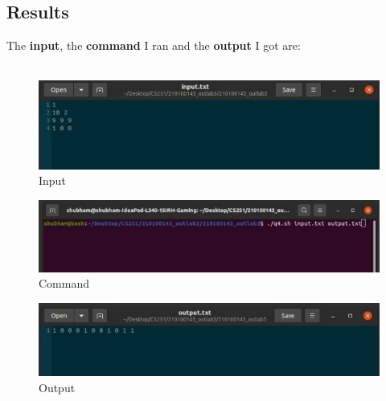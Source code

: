 \documentclass[12pt]{article}
\begin{document}
\subsection{Results}
\vspace*{1em}
The \textbf{input}, the \textbf{command} I ran and the \textbf{output} I got are:\\\\
\begin{figure}[h]
    \includegraphics[width=\textwidth]{Q4_input.jpeg}
    \caption[]{Input}
\end{figure}
\vspace*{2em}
\begin{figure}[h]
    \includegraphics[width=\textwidth]{Q4_command.jpeg}
    \caption[]{Command}
\end{figure}
\vspace*{2em}
\begin{figure}[h]
    \includegraphics[width=\textwidth]{Q4_output.jpeg}
    \caption[]{Output}
\end{figure}
\newpage


 
\end{document}
